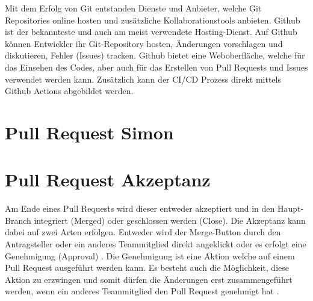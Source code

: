 Mit dem Erfolg von Git entstanden Dienste und Anbieter, welche Git Repositories online hosten und zusätzliche Kollaborationstools anbieten. Github ist der bekannteste und auch am meist verwendete Hosting-Dienst. Auf Github können Entwickler ihr Git-Repository hosten, Änderungen vorschlagen und diskutieren, Fehler (Issues) tracken. Github bietet eine Weboberfläche, welche für das Einsehen des Codes, aber auch für das Erstellen von Pull Requests und Issues verwendet werden kann. Zusätzlich kann der CI/CD Prozess direkt mittels Github Actions abgebildet werden. 

\section{Pull Request Simon} 
\parencite{noauthor_about_nodate} 
\section{Pull Request Akzeptanz}
Am Ende eines Pull Requests wird dieser entweder akzeptiert und in den Haupt-Branch integriert (Merged) oder geschlossen werden (Close)\parencite{noauthor_merging_nodate}\parencite{noauthor_closing_nodate}. Die Akzeptanz kann dabei auf zwei Arten erfolgen. Entweder wird der Merge-Button durch den Antragsteller oder ein anderes Teammitglied direkt angeklickt oder es erfolgt eine Genehmigung (Approval) \parencite{noauthor_merging_nodate}\parencite{noauthor_reviewing_nodate}. Die Genehmigung ist eine Aktion welche auf einem Pull Request ausgeführt werden kann. Es besteht auch die Möglichkeit, diese Aktion zu erzwingen und somit dürfen die Änderungen erst zusammengeführt werden, wenn ein anderes Teammitglied den Pull Request genehmigt hat \parencite{noauthor_approving_nodate}.

